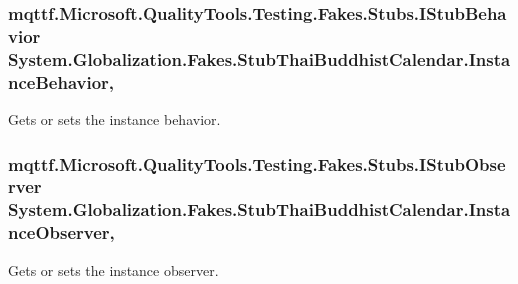 \hypertarget{class_system_1_1_globalization_1_1_fakes_1_1_stub_thai_buddhist_calendar_a726a49d299bc7e23bf8289c5e77c9d1a}{
\subsubsection[{Instance\-Behavior}]{\setlength{\rightskip}{0pt plus 5cm}mqttf.\-Microsoft.\-Quality\-Tools.\-Testing.\-Fakes.\-Stubs.\-I\-Stub\-Behavior System.\-Globalization.\-Fakes.\-Stub\-Thai\-Buddhist\-Calendar.\-Instance\-Behavior\hspace{0.3cm}{\ttfamily [get]}, {\ttfamily [set]}}}\label{class_system_1_1_globalization_1_1_fakes_1_1_stub_thai_buddhist_calendar_a726a49d299bc7e23bf8289c5e77c9d1a}


Gets or sets the instance behavior.

\hypertarget{class_system_1_1_globalization_1_1_fakes_1_1_stub_thai_buddhist_calendar_aa1400441612f991888a5f458ad6a6d11}{
\subsubsection[{Instance\-Observer}]{\setlength{\rightskip}{0pt plus 5cm}mqttf.\-Microsoft.\-Quality\-Tools.\-Testing.\-Fakes.\-Stubs.\-I\-Stub\-Observer System.\-Globalization.\-Fakes.\-Stub\-Thai\-Buddhist\-Calendar.\-Instance\-Observer\hspace{0.3cm}{\ttfamily [get]}, {\ttfamily [set]}}}\label{class_system_1_1_globalization_1_1_fakes_1_1_stub_thai_buddhist_calendar_aa1400441612f991888a5f458ad6a6d11}


Gets or sets the instance observer.

